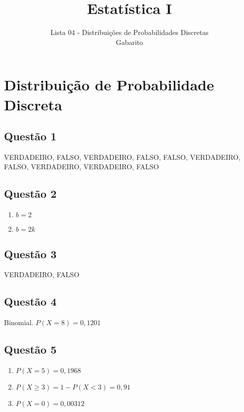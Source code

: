 \documentclass[
]{article}
\title{Estatística I}
\subtitle{Lista 04 - Distribuições de Probabilidades Discretas\\
Gabarito}
\author{}
\date{\vspace{-2.5em}}
\begin{document}
\maketitle

\hypertarget{distribuiuxe7uxe3o-de-probabilidade-discreta}{%
\section{Distribuição de Probabilidade
Discreta}\label{distribuiuxe7uxe3o-de-probabilidade-discreta}}

\hypertarget{questuxe3o-1}{%
\subsection{Questão 1}\label{questuxe3o-1}}

VERDADEIRO, FALSO, VERDADEIRO, FALSO, FALSO, VERDADEIRO, FALSO,
VERDADEIRO, VERDADEIRO, FALSO

\hypertarget{questuxe3o-2}{%
\subsection{Questão 2}\label{questuxe3o-2}}

\begin{enumerate}
\def\labelenumi{\alph{enumi})}
\item
  \(b=2\)
\item
  \(b=2k\)
\end{enumerate}

\hypertarget{questuxe3o-3}{%
\subsection{Questão 3}\label{questuxe3o-3}}

VERDADEIRO, FALSO

\hypertarget{questuxe3o-4}{%
\subsection{Questão 4}\label{questuxe3o-4}}

Binomial. \(P(X=8)=0,1201\)

\hypertarget{questuxe3o-5}{%
\subsection{Questão 5}\label{questuxe3o-5}}

\begin{enumerate}
\def\labelenumi{\alph{enumi})}
\item
  \(P(X=5)=0,1968\)
\item
  \(P(X\geq 3) = 1-P(X<3)=0,91\)
\item
  \(P(X=0)=0,00312\)
\end{enumerate}
\end{document}
